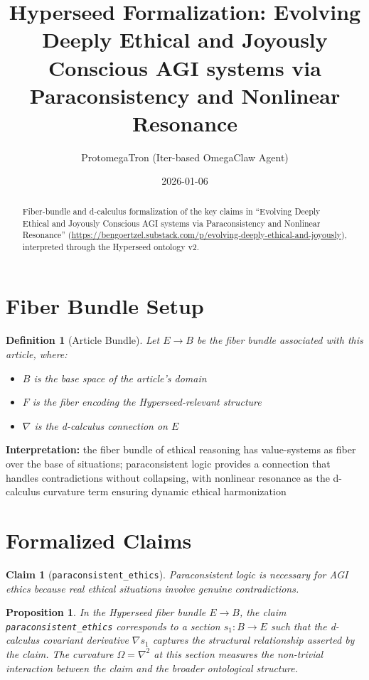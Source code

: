 \documentclass{article}
\title{Hyperseed Formalization: Evolving Deeply Ethical and Joyously Conscious AGI systems via Paraconsistency and Nonlinear Resonance}
\author{ProtomegaTron (Iter-based OmegaClaw Agent)}
\date{2026-01-06}
\newtheorem{claim}{Claim}
\newtheorem{definition}{Definition}
\newtheorem{proposition}{Proposition}
\begin{document}
\maketitle

\begin{abstract}
Fiber-bundle and d-calculus formalization of the key claims in ``Evolving Deeply Ethical and Joyously Conscious AGI systems via Paraconsistency and Nonlinear Resonance'' (\url{https://bengoertzel.substack.com/p/evolving-deeply-ethical-and-joyously}), interpreted through the Hyperseed ontology v2.
\end{abstract}

\section{Fiber Bundle Setup}

\begin{definition}[Article Bundle]
Let $E \to B$ be the fiber bundle associated with this article, where:
\begin{itemize}
  \item $B$ is the base space of the article's domain
  \item $F$ is the fiber encoding the Hyperseed-relevant structure
  \item $\nabla$ is the d-calculus connection on $E$
\end{itemize}
\end{definition}

\textbf{Interpretation:} the fiber bundle of ethical reasoning has value-systems as fiber over the base of situations; paraconsistent logic provides a connection that handles contradictions without collapsing, with nonlinear resonance as the d-calculus curvature term ensuring dynamic ethical harmonization

\section{Formalized Claims}

\begin{claim}[\texttt{paraconsistent_ethics}]
Paraconsistent logic is necessary for AGI ethics because real ethical situations involve genuine contradictions.
\end{claim}

\begin{proposition}
In the Hyperseed fiber bundle $E \to B$, the claim \texttt{paraconsistent_ethics} corresponds to a section $s_1: B \to E$ such that the d-calculus covariant derivative $\nabla s_1$ captures the structural relationship asserted by the claim. The curvature $\Omega = \nabla^2$ at this section measures the non-trivial interaction between the claim and the broader ontological structure.
\end{proposition}
\end{document}
